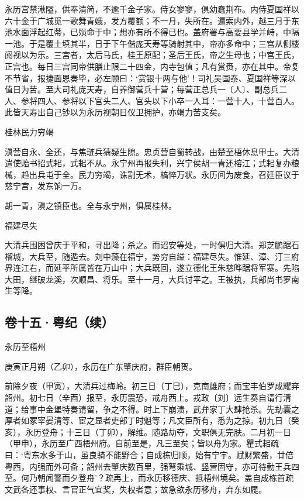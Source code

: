 \documentclass[]{article}
\begin{document}
永历宫禁湫隘，供奉清简，不逾千金子家。侍女寥寥，俱幼蠢荆布。内侍夏国祥以六十金于广城觅一歌舞青娥，发方覆额；不一月，失所在。遍索内外，越三月于东池水面浮起红蒂，已殒命于中；想亦有所不得已也。盖府署与高要县学并峙，中隔一池。于是覆土填其半，日于下午偕庞天寿等骑射其中，帝亦多命中；三宫从侧楼阅视以为乐。三宫者，太后马氏，桂王原配；圣后王氏，帝之生母也；中宫王氏，正宫也。每日三宫同帝供膳止限二十四金，内寺包值；凡有赏赉，亦在其中。帝复不节省，报捷面恩奏毕，必左顾曰：`赏银十两与他'！司礼吴国泰、夏国祥等深以值日为苦。至大司礼庞天寿，自养御营兵十营；每营正总兵一〔人〕、副总兵二人、参将四人、参将以下官头二人、官头以下小卒一人耳：一营十人，十营百人。此皆天寿出自己钞以为永历视朝日仪卫拥护，亦竭力苦支矣。

桂林民力穷竭

滇营自永、全还，与焦琏兵猜疑生隙。忠贞营自蜀转战，由楚至梧休息甲士。大清遣使贻书招式耜，式耜不从。永宁州再报失利，兴宁侯胡一青还榕江；式耜复办粮械，趋出兵屯于全。民力穷竭，诛割无术，槁悴万状。永历间为废食，召廷臣议于慈宁宫，发东饷一万。

胡一青，滇之镇臣也。全与永宁州，俱属桂林。

福建尽失

大清兵围困曾庆于平和，寻出降；杀之。而诏安等处，一时俱归大清。郑芝鹏踞石榴城，大兵至，随遁去。刘中藻在福宁，势穷自缢：福建尽失。惟延、漳、汀三府界连江右，而延平所属皆在万山中；大兵既回，遂立德化王朱慈晔踞将军寨。先陷大田，继破龙溪，次顺昌、将乐。至十一月，大兵讨平之。王被执，兵部尚书罗南生等降。

\hypertarget{header-n87}{%
\subsection{卷十五·粤纪（续）}\label{header-n87}}

永历至梧州

庚寅正月朔（乙卯），永历在广东肇庆府，群臣朝贺。

前除夕夜（甲寅），大清兵过梅岭。初三日（丁巳），克南雄府；而宝丰伯罗成耀弃韶州。初七日（辛酉）报至，永历震恐，戒舟西上。戎政〔刘〕远生奏自请行清道；给事中金堡特奏请留，争之不得。时上下崩溃，武弁家丁大肆抢杀。先劫囊之厚者如冢宰晏清等、宦之显者吏部丁时魁等；凡文臣所有，悉为之掠。初九日（癸亥），永历登舟；十三日（丁卯），解维。随路劫夺，文职俱无完肤。二月初一日（甲申），永历至广西梧州府。自前至是，凡三至矣；皆以舟为家。瞿式耜疏曰：`粤东水多于山，虽良骑不能野合；自成栋归顺，始有宁宇。赋财繁盛，廿倍粤西，内强而外可备；韶州去肇庆数百里，强弩乘城、竖营固守，亦可待勤王兵四至。何乃朝闻警而夕登舟'？疏再上，而永历移德庆、抵梧州境矣。盖自成栋首疏文武各还事权、言官正气宜奖，失权者意；故急欲永历移舟，弃东如屣。
\end{document}
